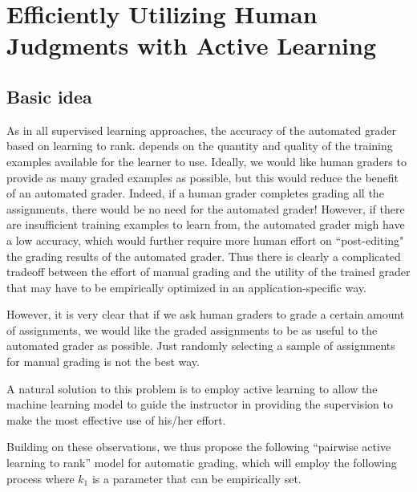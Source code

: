 \section{Efficiently Utilizing Human Judgments with Active Learning}

\subsection{Basic idea}

As in all supervised learning approaches, 
the accuracy of  the automated grader based on learning to rank. depends
on the quantity and quality of the training examples available for the 
learner to use. Ideally, we would like human graders to provide
 as many graded examples as possible, but this would
reduce the benefit of an automated grader. Indeed,
if a human grader completes grading all the assignments,
there would be no need for the automated grader!
However, if there are insufficient training examples 
to learn from, the automated grader migh have a low accuracy,
which would further require more human effort on 
``post-editing" the grading results of the automated grader. 
Thus there is clearly a complicated tradeoff between
the effort of manual grading and the utility of the trained
 grader that may have to be empirically optimized in an application-specific way.

However, it is very clear that if we ask human graders to grade
a certain amount of assignments, we would like the
graded assignments to be as useful to the automated grader as possible.
Just randomly selecting a sample of assignments for manual grading
is not the best way. 
A natural solution to this problem is to employ 
active learning to allow the machine learning model to
guide the instructor in providing the supervision to make the most
effective use of his/her effort.

Building on these observations, we thus propose the following ``pairwise active
learning to rank'' model for automatic grading, which will employ the
following process where $k_1$ is a parameter that can be empirically set. 

